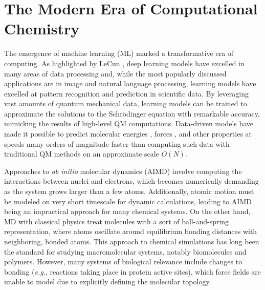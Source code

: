 \section{The Modern Era of Computational Chemistry}
\label{sec:ML_in_chem}
The emergence of machine learning (ML) marked a transformative era of computing. 
As highlighted by LeCun \cite{deep_learning_lecun}, deep learning models have excelled in many areas of data processing and, while the most popularly discussed applications are in image and natural language processing, learning models have excelled at pattern recognition and prediction in scientific data.
By leveraging vast amounts of quantum mechanical data, learning models can be trained to approximate the solutions to the Schrödinger equation with remarkable accuracy, mimicking the results of high-level QM computations.
Data-driven models have made it possible to predict molecular energies \cite{deep_tensor_NNs_schutt, prediction_errors_ml_lower_than_dft_faber, ml_atomization_energies_rupp}, 
forces \cite{interatomic_ff_ML_glielmo, md_onthefly_ml_forces_li}, 
and other properties \cite{PerSpect_ml, TensorMol}
at speeds many orders of magnitude faster than computing such data with traditional QM methods on an approximate scale $O(N)$. 

Approaches to \textit{ab initio} molecular dynamics (AIMD) involve computing the interactions between nuclei and electrons, which becomes numerically demanding as the system grows larger than a few atoms.
Additionally, atomic motion must be modeled on very short timescale for dynamic calculations, leading to AIMD being an impractical approach for many chemical systems.
On the other hand, MD with classical physics treat molecules with a sort of ball-and-spring representation, where atoms oscillate around equilibrium bonding distances with neighboring, bonded atoms.
This approach to chemical simulations has long been the standard for studying macromolecular systems, notably biomolecules and polymers.
However, many systems of biological relevance include changes to bonding (\textit{e.g.}, reactions taking place in protein active sites), which force fields are unable to model due to explicitly defining the molecular topology.

